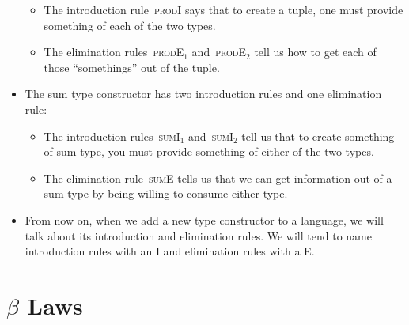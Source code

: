 \documentclass{lecturenotes}
\begin{document}
\begin{itemize}
  \begin{itemize}
  \item The introduction rule~\textsc{prodI} says that to create a tuple, one must provide something of each of the two types.
  \item The elimination rules~\textsc{prodE${}_1$} and~\textsc{prodE${}_2$} tell us how to get each of those ``somethings'' out of the tuple.
  \end{itemize}
\item The sum type constructor has two introduction rules and one elimination rule:
  \begin{itemize}
  \item The introduction rules~\textsc{sumI${}_1$} and~\textsc{sumI${}_2$} tell us that to create something of sum type, you must provide something of either of the two types.
  \item The elimination rule~\textsc{sumE} tells us that we can get information out of a sum type by being willing to consume either type.
  \end{itemize}
\item From now on, when we add a new type constructor to a language, we will talk about its introduction and elimination rules.
  We will tend to name introduction rules with an \textsc{I} and elimination rules with a \textsc{E}.
\end{itemize}

\section{$\beta$ Laws}
\label{sec:beta-laws}
\end{document}
